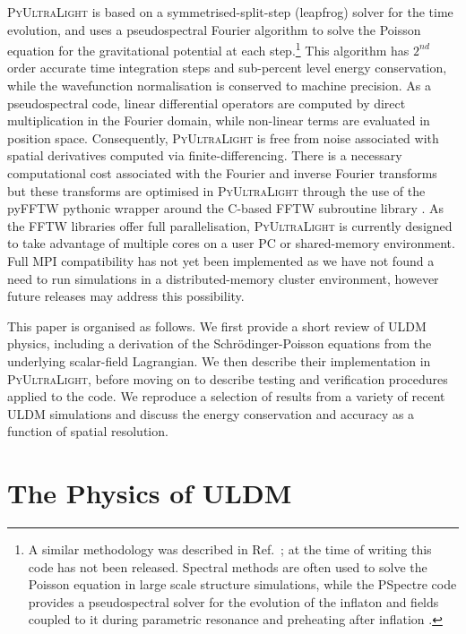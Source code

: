 \documentclass[a4paper,11pt]{article}
\newcommand{\PyUltraLight}{\textsc{PyUltraLight}\xspace}
\begin{document}
\PyUltraLight is based on a symmetrised-split-step (leapfrog) solver for the time evolution, and uses a pseudospectral Fourier algorithm to solve the Poisson equation for the gravitational potential at each step.\footnote{A similar methodology was described in Ref.~\cite{Paredes:2015wga}; at the time of writing this code has not been released. Spectral methods are often used to solve the Poisson equation in large scale structure simulations, while the {\sc PSpectre} code \cite{Easther:2010qz} provides a pseudospectral solver for the evolution of the inflaton  and fields coupled to it during parametric resonance and preheating after inflation \cite{Amin:2010dc,Amin:2011hj,Zhou:2013tsa}.} This algorithm has $2^{nd}$ order accurate time integration steps and sub-percent level energy conservation, while the wavefunction normalisation  is conserved to machine precision. As a pseudospectral code, linear differential operators are computed by direct multiplication in the Fourier domain, while non-linear terms are evaluated in position space. Consequently, \PyUltraLight is free from noise associated with spatial derivatives computed via finite-differencing. There is a necessary computational cost associated with the Fourier and inverse Fourier transforms but these transforms are optimised in \PyUltraLight through the use of the pyFFTW pythonic wrapper around the C-based FFTW subroutine library \cite{pyfftw,fftw}. As the FFTW libraries offer full parallelisation, \PyUltraLight is currently designed to take advantage of multiple cores on a user PC or shared-memory environment. Full MPI compatibility has not yet been implemented as we have not found a need to run simulations in a distributed-memory cluster environment, however future releases may address this possibility. 

This paper is organised as follows. We first provide a short review of ULDM physics, including a derivation of the Schr{\"o}dinger-Poisson equations from the underlying scalar-field Lagrangian. We then describe their implementation in \PyUltraLight, before moving on to describe testing and verification procedures applied to the code. We reproduce a selection of results from a variety of recent ULDM simulations and discuss the energy conservation and accuracy as a function of spatial resolution. 


\section{The Physics of ULDM}\label{sec:physics}
\end{document}

